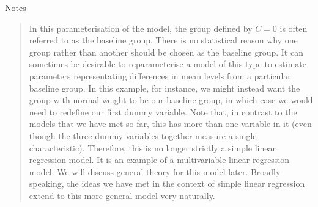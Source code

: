 \documentclass[letterpaper,10pt,english]{jupyterBook}
\begin{document}
\sphinxAtStartPar
Notes
\begin{quote}

\sphinxAtStartPar
In this parameterisation of the model, the group defined by \(C=0\) is often referred to as the baseline group. There is no statistical reason why one group rather than another should be chosen as the baseline group. It can sometimes be desirable to re\sphinxhyphen{}parameterise a model of this type to estimate parameters representating differences in mean levels from a particular baseline group. In this example, for instance, we might instead want the group with normal weight to be our baseline group, in which case we would need to redefine our first dummy variable.  
Note that, in contrast to the models that we have met so far, this has more than one variable in it (even though the three dummy variables together measure a single characteristic). Therefore, this is no longer strictly a simple linear regression model. It is an example of a multivariable linear regression model. We will discuss general theory for this model later. Broadly speaking, the ideas we have met in the context of simple linear regression extend to this more general model very naturally.
\end{quote}

\begin{sphinxVerbatim}[commandchars=\\\{\}]
 
\end{sphinxVerbatim}
\end{document}
